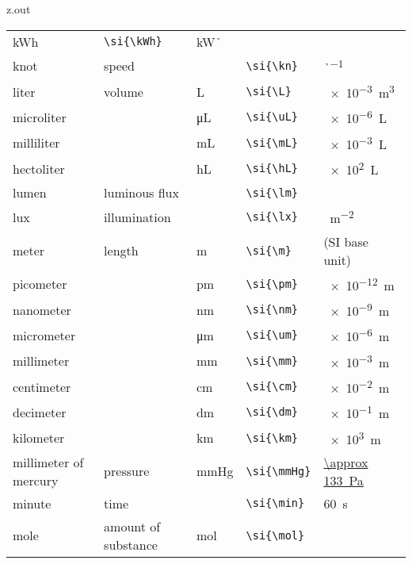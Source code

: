 \begin{VerbatimOut}{z.out}
{\begin{longtable}{@{}P{1.4in}P{1in}llP{1.8in}@{}}
      \si{\kWh}&
      \verb+\si{\kWh}+&
      \si{\kW\h}\\
    \vsp
    knot&
      speed&
      \si{\kn}&
      \verb+\si{\kn}+&
      \si{\M\per\h}\\
    \vsp
    liter&
      volume&
      \si{\L}&
      \verb+\si{\L}+&
      \SI{e-3}{m\cubed}\\
    \quad microliter&
      \ditto&
      \si{\uL}&
      \verb+\si{\uL}+&
      \SI{e-6}{\L}\\
    \quad milliliter&
      \ditto&
      \si{\mL}&
      \verb+\si{\mL}+&
      \SI{e-3}{\L}\\
    \quad hectoliter&
      \ditto&
      \si{\hL}&
      \verb+\si{\hL}+&
      \SI{e2}{\L}\\
    \vsp
    lumen&
      luminous flux&
      \si{\lm}&
      \verb+\si{\lm}+&
      \si{\cd\sr}\\
    \vsp
    lux&
      illumination&
      \si{\lx}&
      \verb+\si{\lx}+&
      \si{\lm\per\m\squared}\\
    \vsp
    meter&
      length&
      \si{\m}&
      \verb+\si{\m}+&
      (SI base unit)\\
    \quad picometer&
      \ditto&
      \si{\pm}&
      \verb+\si{\pm}+&
      \SI{e-12}{\m}\\
    \quad nanometer&
      \ditto&
      \si{\nm}&
      \verb+\si{\nm}+&
      \SI{e-9}{\m}\\
    \quad micrometer&
      \ditto&
      \si{\um}&
      \verb+\si{\um}+&
      \SI{e-6}{\m}\\
    \quad millimeter&
      \ditto&
      \si{\mm}&
      \verb+\si{\mm}+&
      \SI{e-3}{\m}\\
    \quad centimeter&
      \ditto&
      \si{\cm}&
      \verb+\si{\cm}+&
      \SI{e-2}{\m}\\
    \quad decimeter&
      \ditto&
      \si{\dm}&
      \verb+\si{\dm}+&
      \SI{e-1}{\m}\\
    \quad kilometer&
      \ditto&
      \si{\km}&
      \verb+\si{\km}+&
      \SI{e3}{\m}\\
    \vsp
    millimeter of mercury&
      pressure&
      \si{\mmHg}&
      \verb+\si{\mmHg}+&
      \href{https://en.wikipedia.org/wiki/Millimetre_of_mercury}{\SI{\approx 133}{\Pa}}\\
    \vsp
    minute&
      time&
      \si{\min}&
      \verb+\si{\min}+&
      \SI{60}{\s}\\
    \vsp
    mole&
      amount of substance&
      \si{\mol}&
      \verb+\si{\mol}+&

\end{longtable}}
\end{VerbatimOut}
